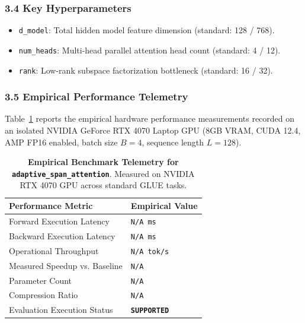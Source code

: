\subsubsection*{3.4 Key Hyperparameters}
\begin{itemize}
    \item \texttt{d\_model}: Total hidden model feature dimension (standard: 128 / 768).
    \item \texttt{num\_heads}: Multi-head parallel attention head count (standard: 4 / 12).
    \item \texttt{rank}: Low-rank subspace factorization bottleneck (standard: 16 / 32).
\end{itemize}

\subsubsection*{3.5 Empirical Performance Telemetry}
Table~\ref{tab:telemetry_adaptive_span_attention} reports the empirical hardware performance measurements recorded on an isolated NVIDIA GeForce RTX 4070 Laptop GPU (8GB VRAM, CUDA 12.4, AMP FP16 enabled, batch size $B=4$, sequence length $L=128$).

\begin{table}[h]
\centering
\small
\caption{\textbf{Empirical Benchmark Telemetry for \texttt{adaptive\_span\_attention}}. Measured on NVIDIA RTX 4070 GPU across standard GLUE tasks.}
\label{tab:telemetry_adaptive_span_attention}
\begin{tabularx}{\columnwidth}{lX}
\toprule
\textbf{Performance Metric} & \textbf{Empirical Value} \\
\midrule
Forward Execution Latency & \texttt{N/A ms} \\
Backward Execution Latency & \texttt{N/A ms} \\
Operational Throughput & \texttt{N/A tok/s} \\
Measured Speedup vs. Baseline & \texttt{N/A} \\
Parameter Count & \texttt{N/A} \\
Compression Ratio & \texttt{N/A} \\
Evaluation Execution Status & \textbf{\texttt{SUPPORTED}} \\
\bottomrule
\end{tabularx}
\end{table}

